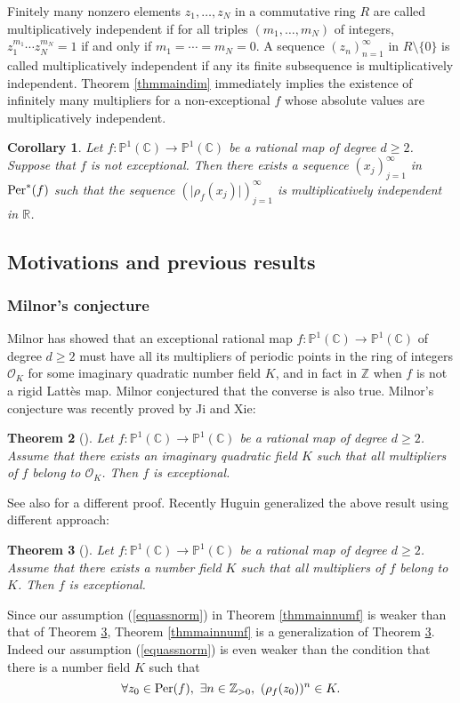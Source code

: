 \documentclass[12pt]{amsart}
\theoremstyle{plain}
\newtheorem{Thm}{Theorem}[section]
\newtheorem{Cor}[Thm]{Corollary}
\theoremstyle{remark}
\theoremstyle{definition}
\def\Z{\mathbb Z}
\def\R{\mathbb R}
\def\C{\mathbb C}
\def\P{\mathbb P}
\begin{document}
\par 
Finitely many nonzero elements $z_1,\dots,z_N$ in a commutative ring $R$ are called multiplicatively independent if for all triples $(m_1,\dots,m_N)$ of integers, $z_1^{m_1}\cdots z_N^{m_N}=1$ if and only if $m_1=\cdots=m_N=0$. A sequence $(z_n)_{n=1}^\infty$ in $R\setminus\{0\}$ is called multiplicatively independent if any its finite subsequence is multiplicatively independent. Theorem \ref{thmmaindim} immediately implies the existence of infinitely many multipliers for a non-exceptional $f$ whose absolute values are multiplicatively independent.
\begin{Cor}\label{cor1.6}
	Let $f:\P^1(\C)\to\P^1(\C)$ be a rational map of degree $d\geq2$. Suppose that $f$ is not exceptional. Then there exists a sequence $(x_j)_{j=1}^\infty$ in ${\rm Per}^*(f)$ such that the sequence $(\lvert\rho_f(x_j)\rvert)_{j=1}^\infty$ is multiplicatively independent in $\R$.
\end{Cor}




\subsection{Motivations and previous results}
\subsubsection{Milnor's conjecture}
Milnor \cite{milnor2006lattes} has showed that an exceptional rational map $f:\P^1(\C)\to\P^1(\C)$  of degree $d\geq2$ must have all its multipliers of periodic points in the  ring of integers $\mathcal{O}_K$ for some imaginary quadratic number field $K$, and in fact in $\Z$ when $f$ is not a rigid Latt\`es map. Milnor conjectured that the converse is also true. Milnor's conjecture was recently proved by Ji and Xie:
\begin{Thm}[{\cite[Theorem 1.13]{Ji2023}}]\label{thmjx} Let $f:\P^1(\C)\to\P^1(\C)$ be a rational map of degree $d\geq2$. Assume that there exists an imaginary quadratic field $K$ such that all multipliers of $f$ belong to $\mathcal{O}_K$. Then $f$ is exceptional.
\end{Thm} See also \cite{Buff2022} for a different proof. Recently Huguin generalized the above result using different approach:
\begin{Thm}[{\cite[Theorem 7]{Huguin2023}}]\label{thmh}Let $f:\P^1(\C)\to\P^1(\C)$ be a rational map of degree $d\geq2$. Assume that there exists a number field $K$ such that all multipliers of $f$ belong to $K$. Then $f$ is exceptional.
\end{Thm}
Since our assumption (\ref{equassnorm}) in Theorem \ref{thmmainnumf} is weaker than that of Theorem \ref{thmh}, Theorem \ref{thmmainnumf}  is a generalization of Theorem \ref{thmh}. 
Indeed our assumption (\ref{equassnorm}) is even weaker than the condition that there is a number field $K$ such that \begin{equation}
	\forall z_0\in{\rm Per}(f),\ \exists
	n\in\Z_{>0},\ (\rho_f(z_0))^n\in K.
\end{equation}
\end{document}
